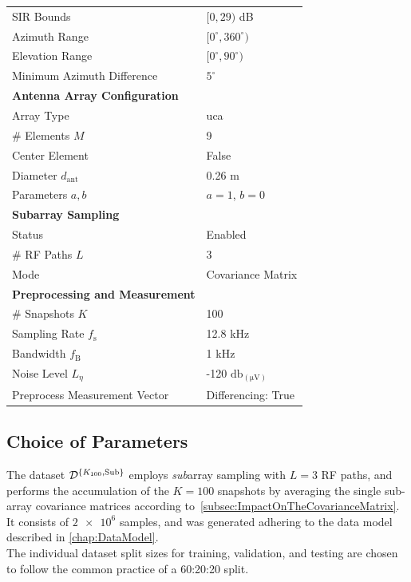 \begin{table}
\begin{tabularx}{\textwidth}{@{}lX@{}}
    SIR Bounds & \( [0, 29) \) dB \\
    Azimuth Range & \( [0^\circ, 360^\circ) \) \\
    Elevation Range & \( [0^\circ, 90^\circ) \) \\
    Minimum Azimuth Difference  & \( 5^\circ \) \\
    \addlinespace
    \midrule
    \textbf{Antenna Array Configuration} & \\
    Array Type & \glsdesc{uca} \\
    \# Elements \( M \) & 9 \\
    Center Element & False \\
    Diameter \( d_{\text{ant}} \) & 0.26 m \\
    Parameters \( a, b \) & \( a = 1 \), \( b = 0 \) \\
    \addlinespace
    \midrule
    \textbf{Subarray Sampling} & \\
    Status & Enabled \\
    \# RF Paths \( L \) & 3 \\
    Mode & Covariance Matrix \\
    \addlinespace
    \midrule
    \textbf{Preprocessing and Measurement} & \\
    \# Snapshots \( K \) & 100 \\
    Sampling Rate \( f_{\text{s}} \) & 12.8 \si{\kilo\hertz}  \\
    Bandwidth \( f_{\text{B}} \) & 1 \si{\kilo\hertz} \\
    Noise Level \( L_{\eta} \) & -120 \( \si{\decibel}_{(\si{\micro\volt})} \) \\
    Preprocess Measurement Vector & Differencing: True \\
    \bottomrule
    \end{tabularx}
    \label{tab:dataset_parameters}
\end{table}

\subsection{Choice of Parameters}
The dataset \( \mathcal{D}^{\{K_{100},\text{Sub}\}} \) employs \textit{sub}array sampling with \( L = 3 \) RF paths, and performs the accumulation of the \( K = 100 \) snapshots by
averaging the single sub-array covariance matrices according to~\autoref{subsec:ImpactOnTheCovarianceMatrix}. \\
It consists of \( \num{2e6} \) samples, and was generated adhering to the data model described in \autoref{chap:DataModel}.\\
The individual dataset split sizes for training, validation, and testing are chosen to follow the common practice of a 60:20:20 split.

